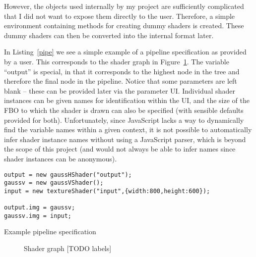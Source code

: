 \documentclass[12pt,twoside,notitlepage]{report}
\begin{document}
However, the objects used internally by my project are sufficiently complicated that I did not want to expose them directly to the user. Therefore, a simple environment containing methods for creating dummy shaders is created. These dummy shaders can then be converted into the internal format later.

In Listing~\ref{pipe} we see a simple example of a pipeline specification as provided by a user. This corresponds to the shader graph in Figure~\ref{pipe-graph}. The variable ``output'' is special, in that it corresponds to the highest node in the tree and therefore the final node in the pipeline. Notice that some parameters are left blank -- these can be provided later via the parameter UI. Individual shader instances can be given names for identification within the UI, and the size of the FBO to which the shader is drawn can also be specified (with sensible defaults provided for both). Unfortunately, since JavaScript lacks a way to dynamically find the variable names within a given context, it is not possible to automatically infer shader instance names without using a JavaScript parser, which is beyond the scope of this project (and would not always be able to infer names since shader instances can be anonymous).
\begin{listing}[H]
\label{pipe}
\begin{verbatim}
output = new gaussHShader("output");
gaussv = new gaussVShader();
input = new textureShader("input",{width:800,height:600});

output.img = gaussv;
gaussv.img = input;
\end{verbatim}
\caption{Example pipeline specification}
\end{listing}

\begin{figure}
\label{pipe-graph}
\caption{Shader graph [TODO labels]}
\end{figure}
\end{document}
